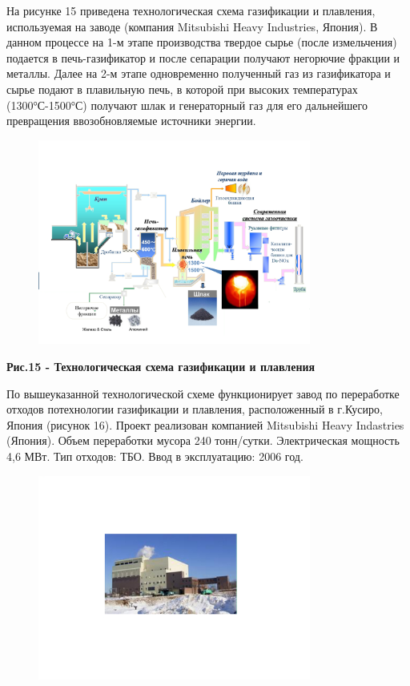 На рисунке 15 приведена технологическая схема газификации и плавления,
используемая на заводе (компания Mitsubishi Heavy Industries, Япония). В
данном процессе на 1-м этапе производства твердое сырье (после
измельчения) подается в печь-газификатор и после сепарации получают
негорючие фракции и металлы. Далее на 2-м этапе одновременно полученный
газ из газификатора и сырье подают в плавильную печь, в которой при
высоких температурах (1300°С-1500°С) получают шлак и генераторный газ
для его дальнейшего превращения ввозобновляемые источники энергии.


\begin{figure}[H]
	\centering
	\includegraphics[width=0.8\textwidth]{media/chem2/image78}
	\caption*{}
\end{figure}


{\bfseries Рис.15 - Технологическая схема газификации и плавления}

По вышеуказанной технологической схеме функционирует завод по
переработке отходов потехнологии газификации и плавления, расположенный
в г.Кусиро, Япония (рисунок 16). Проект реализован компанией Mitsubishi
Heavy Indastries (Япония). Объем переработки мусора 240 тонн/сутки.
Электрическая мощность 4,6 МВт. Тип отходов: ТБО. Ввод в эксплуатацию:
2006 год.


\begin{figure}[H]
	\centering
	\includegraphics[width=0.8\textwidth]{media/chem2/image79}
	\caption*{}
\end{figure}


